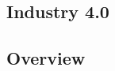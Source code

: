 \subsection{Industry 4.0}
\label{sec:arrowhead:industry40}

\subsection{Overview}
\label{sec:arrowhead:overview}